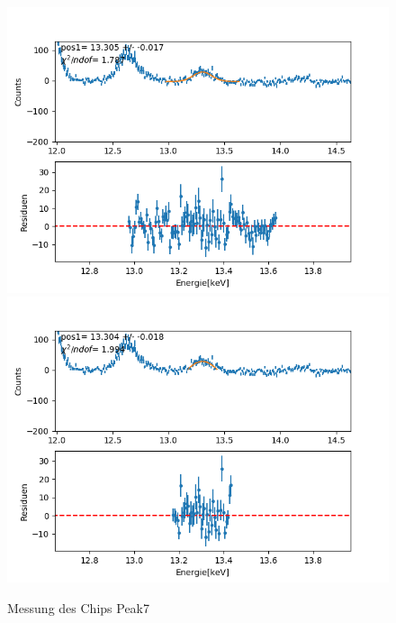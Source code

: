 \documentclass[12pt,a4paper]{article}
\begin{document}
\begin{figure}[H]
\centering
\includegraphics[scale=0.49]{Bilder/roentgen_spektren/chip/chip7_1.png}
\includegraphics[scale=0.49]{Bilder/roentgen_spektren/chip/chip7_2.png}
\caption{Messung des Chips Peak7}
\end{figure}
\end{document}

